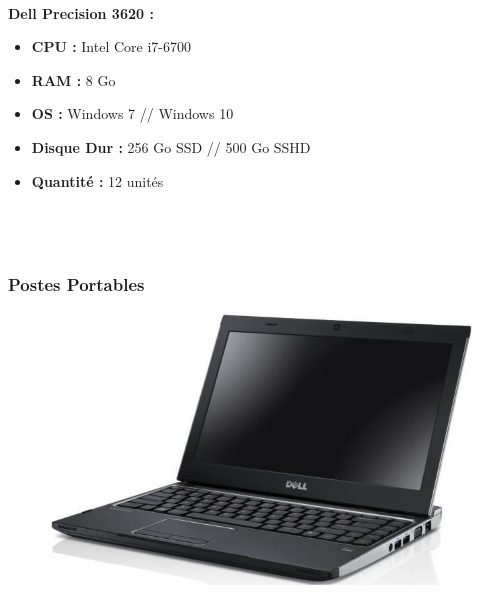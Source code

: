\documentclass[11pt,a4paper,oneside]{article}
\begin{document}
\paragraph{}\textbf{Dell Precision 3620 :} \\
\begin{itemize}
\item \textbf{CPU :} Intel Core i7-6700
\item \textbf{RAM :} 8 Go
\item \textbf{OS :} Windows 7 // Windows 10
\item \textbf{Disque Dur :} 256 Go SSD // 500 Go SSHD
\item \textbf{Quantité :} 12 unités
\\ \\ \\ \\
\end{itemize}
\newpage

\subsubsection{Postes Portables}
\begin{figure}
\includegraphics[scale=0.4]{Ressources/Materiel/V131.jpg}\vspace{-2cm}
\end{figure}
\end{document}
